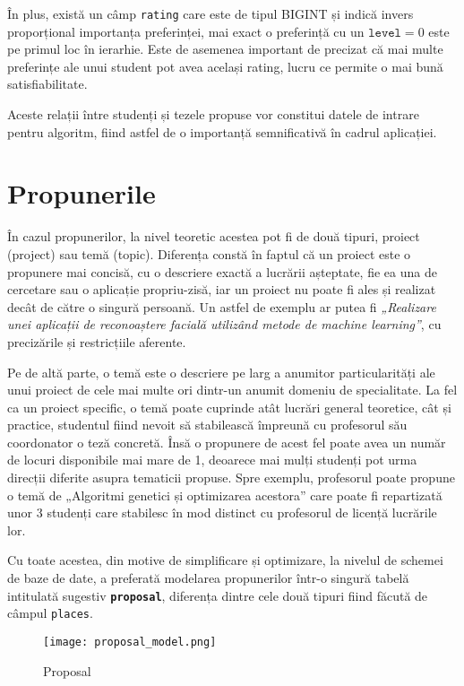 În plus, există un câmp \texttt{rating} care este de tipul BIGINT și indică invers proporțional importanța preferinței, mai exact o preferință cu un $\texttt{level} = 0 $ este pe primul loc în ierarhie. Este de asemenea important de precizat că mai multe preferințe ale unui student pot avea același rating, lucru ce permite o mai bună satisfiabilitate.

Aceste relații între studenți și tezele propuse vor constitui datele de intrare pentru algoritm, fiind astfel de o importanță semnificativă în cadrul aplicației.

\section{Propunerile}

În cazul propunerilor, la nivel teoretic acestea pot fi de două tipuri, proiect (project) sau temă (topic). Diferența constă în faptul că un proiect este o propunere mai concisă, cu o descriere exactă a lucrării așteptate, fie ea una de cercetare sau o aplicație propriu-zisă, iar un proiect nu poate fi ales și realizat decât de către o singură persoană.
Un astfel de exemplu ar putea fi \textit{„Realizare unei aplicații de reconoaștere facială utilizând metode de machine learning”}, cu precizările și restricțiile aferente.

Pe de altă parte, o temă este o descriere pe larg a anumitor particularități ale unui proiect de cele mai multe ori dintr-un anumit domeniu de specialitate. La fel ca un proiect specific, o temă poate cuprinde atât lucrări general teoretice, cât și practice, studentul fiind nevoit să stabilească împreună cu profesorul său coordonator o teză concretă. Însă o propunere de acest fel poate avea un număr de locuri disponibile mai mare de 1, deoarece mai mulți studenți pot urma direcții diferite asupra tematicii propuse. Spre exemplu, profesorul poate propune o temă de „Algoritmi genetici și optimizarea acestora” care poate fi repartizată unor 3 studenți care stabilesc în mod distinct cu profesorul de licență lucrările lor.

Cu toate acestea, din motive de simplificare și optimizare, la nivelul de schemei de baze de date, a preferată modelarea propunerilor într-o singură tabelă intitulată sugestiv \textbf{\texttt{proposal}}, diferența dintre cele două tipuri fiind făcută de câmpul \texttt{places}. 

\begin{figure}[H]
	\centering
	\texttt{[image: proposal\_model.png]}
	\caption{Proposal}
\end{figure}

